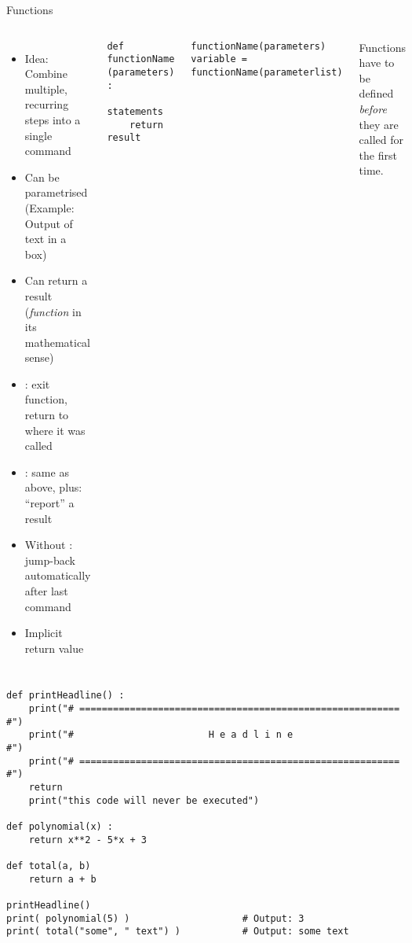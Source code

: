 \begin{frame}[fragile]{Functions}
%
\vspace{-20pt}
\begin{columns}[t]
\begin{itemize}
\item Idea: Combine multiple, recurring steps into a single command
\item Can be parametrised (Example: Output of text in a box)
\item Can return a result (\Thus \emph{function} in its mathematical sense)
\item {}: exit function, return to where it was called
\item {}: same as above, plus: \enquote{report} a result
\item Without : jump-back automatically after last command
\item Implicit return value 
\end{itemize}
%
\begin{codebox}
\begin{verbatim}
def functionName (parameters) :
    statements
    return result
\end{verbatim}
\end{codebox}
%
\begin{codebox}
\begin{verbatim}
functionName(parameters)
variable = functionName(parameterlist)
\end{verbatim}
\end{codebox}
%
\begin{hintbox}
Functions have to be defined \emph{before} they are called for the first time.
\end{hintbox}
\end{columns}
%
\end{frame}


\begin{frame}[fragile]
%
\begin{codebox}
\begin{verbatim}
def printHeadline() :
    print("# ========================================================= #")
    print("#                        H e a d l i n e                    #")
    print("# ========================================================= #")
    return
    print("this code will never be executed")

def polynomial(x) :
    return x**2 - 5*x + 3

def total(a, b)
    return a + b
    
printHeadline()
print( polynomial(5) )                    # Output: 3
print( total("some", " text") )           # Output: some text
\end{verbatim}
\end{codebox}
%
\end{frame}


